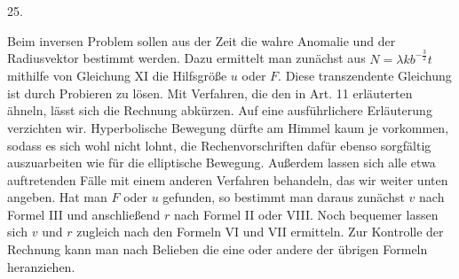 \par{}
\begin{center}
\hypertarget{native-042-article025}{}25.
\end{center}
Beim inversen Problem sollen aus der Zeit die wahre Anomalie und der Radiusvektor bestimmt werden. Dazu ermittelt man zunächst aus $N=\lambda kb^{-\frac{3}{2}}t$ mithilfe von Gleichung XI die Hilfsgröße $u$ oder $F$. Diese transzendente Gleichung ist durch Probieren zu lösen. Mit Verfahren, die den in Art. 11 erläuterten ähneln, lässt sich die Rechnung abkürzen. Auf eine ausführlichere Erläuterung verzichten wir. Hyperbolische Bewegung dürfte am Himmel kaum je vorkommen, sodass es sich wohl nicht lohnt, die Rechenvorschriften dafür ebenso sorgfältig auszuarbeiten wie für die elliptische Bewegung. Außerdem lassen sich alle etwa auftretenden Fälle mit einem anderen Verfahren behandeln, das wir weiter unten angeben. Hat man $F$ oder $u$ gefunden, so bestimmt man daraus zunächst $v$ nach Formel III und anschließend $r$ nach Formel II oder VIII. Noch bequemer lassen sich $v$ und $r$ zugleich nach den Formeln VI und VII ermitteln. Zur Kontrolle der Rechnung kann man nach Belieben die eine oder andere der übrigen Formeln heranziehen.

